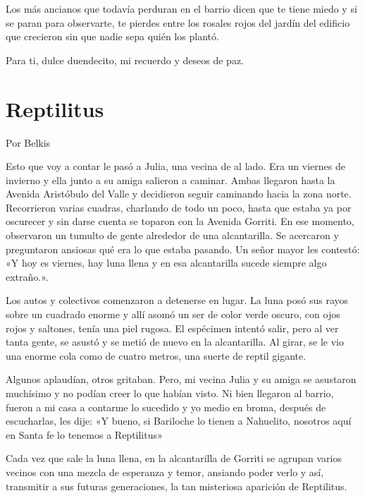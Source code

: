 \documentclass[11pt,twoside,openright,a5paper]{book}
\begin{document}
Los más ancianos que todavía perduran en el barrio dicen que te tiene miedo y si se paran para observarte, te pierdes entre los rosales rojos del jardín del edificio que crecieron sin que nadie sepa quién los plantó.

Para ti, dulce duendecito, mi recuerdo y deseos de paz.      

\section*{Reptilitus}
                                                                                                     \begin{flushright}Por Belkis\end{flushright}

Esto que voy a contar le pasó a Julia, una vecina de al lado. Era un viernes de invierno y ella junto a su amiga salieron a caminar. Ambas llegaron hasta la Avenida Aristóbulo del Valle y decidieron seguir caminando hacia la zona norte. Recorrieron varias cuadras, charlando de todo un poco, hasta que estaba ya por oscurecer y sin darse cuenta se toparon con la Avenida Gorriti. En ese momento, observaron un tumulto de gente alrededor de una alcantarilla. Se acercaron y preguntaron ansiosas qué era lo que estaba pasando. Un señor mayor les contestó: «Y hoy es viernes, hay luna llena y en esa alcantarilla sucede siempre algo extraño.».

Los autos y colectivos comenzaron a detenerse en lugar. La luna posó sus rayos sobre un cuadrado enorme y allí asomó un ser de color verde oscuro, con ojos rojos y saltones, tenía una piel rugosa. El espécimen intentó salir, pero al ver tanta gente, se asustó y se metió de nuevo en la alcantarilla. Al girar, se le vio una enorme cola como de cuatro metros, una suerte de reptil gigante.

Algunos aplaudían, otros gritaban. Pero, mi vecina Julia y su amiga se asustaron muchísimo y no podían creer lo que habían visto. Ni bien llegaron al barrio, fueron a mi casa a contarme lo sucedido y yo medio en broma, después de escucharlas, les dije: «Y bueno, si Bariloche lo tienen a Nahuelito, nosotros aquí en Santa fe lo tenemos a Reptilitus»

Cada vez que sale la luna llena, en la alcantarilla de Gorriti se agrupan varios vecinos con una mezcla de esperanza y temor, ansiando poder verlo y así, transmitir a sus futuras generaciones, la tan misteriosa aparición de Reptilitus.
\end{document}
